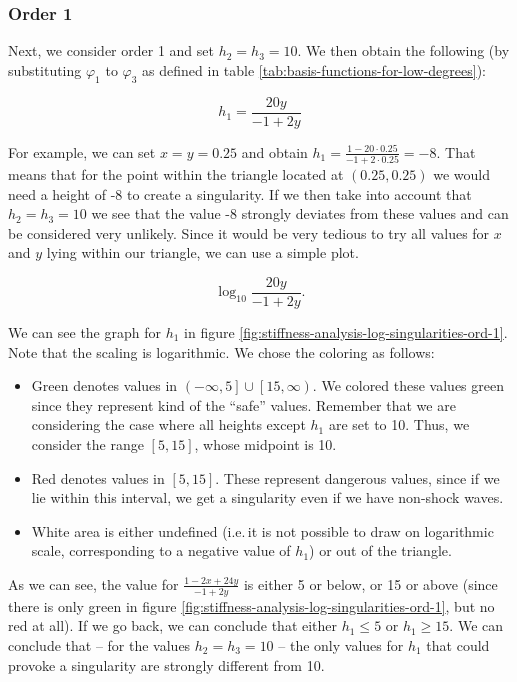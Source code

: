 \documentclass[a4paper, twoside]{article}
\renewcommand{\phi}{\varphi}
\begin{document}
\subsubsection{Order 1}
\label{sec:stiffness-analysis-singluarities-ord-1}

Next, we consider order 1 and set $h_2=h_3=10$. We then obtain the following (by substituting $\phi_1$ to $\phi_3$ as defined in table \ref{tab:basis-functions-for-low-degrees}):

\begin{equation*}
  h_1 = \frac{20y}{-1+2y}
\end{equation*}

For example, we can set $x=y=0.25$ and obtain $  h_1 = \frac{1-20\cdot 0.25}{-1+2\cdot 0.25} = -8$. That means that for the point within the triangle located at $(0.25, 0.25)$ we would need a height of -8 to create a singularity. If we then take into account that $h_2=h_3=10$ we see that the value -8 strongly deviates from these values and can be considered very unlikely. Since it would be very tedious to try all values for $x$ and $y$ lying within our triangle, we can use a simple plot.

\begin{equation*}
\log_{10}\frac{20y}{-1+2y}.
\end{equation*}

We can see the graph for $h_1$ in figure \ref{fig:stiffness-analysis-log-singularities-ord-1}. Note that the scaling is logarithmic. We chose the coloring as follows:

\begin{itemize}
\item Green denotes values in $\left( -\infty, 5 \right] \cup \left[ 15, \infty \right)$. We colored these values green since they represent kind of the ``safe'' values. Remember that we are considering the case where all heights except $h_1$ are set to 10. Thus, we consider the range $\left[ 5, 15 \right]$, whose midpoint is 10.

\item Red denotes values in $\left[ 5, 15 \right]$. These represent dangerous values, since if we lie within this interval, we get a singularity even if we have non-shock waves.
\item White area is either undefined (i.e.\,it is not possible to draw on logarithmic scale, corresponding to a negative value of $h_1$) or out of the triangle.
\end{itemize}

As we can see, the value for $\frac{1-2x+24y}{-1+2y}$ is either 5 or below, or 15 or above (since there is only green in figure \ref{fig:stiffness-analysis-log-singularities-ord-1}, but no red at all). If we go back, we can conclude that either $h_1 \leq 5$ or $h_1 \geq 15$. We can conclude that -- for the values $h_2=h_3=10$ -- the only values for $h_1$ that could provoke a singularity are strongly different from 10.
\end{document}
